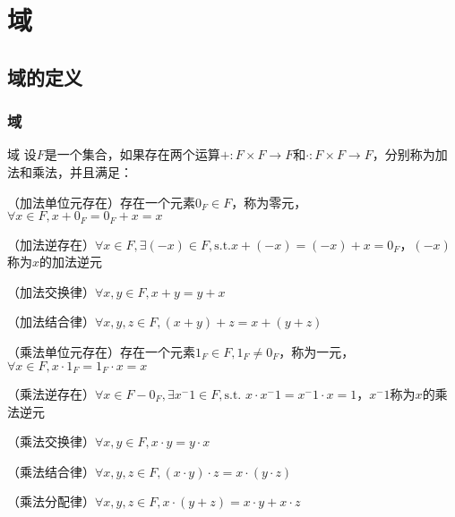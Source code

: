 \documentclass[12pt, a4paper, oneside, UTF8]{ctexbook}
\begin{document}
% 
\else
\fi
\chapter{域}
	\section{域的定义}
		\subsection{域}
			\begin{defn}{域}{}
				设$F$是一个集合，如果存在两个运算$+:F \times F \rightarrow F$和$\cdot :F \times F \rightarrow F$，分别称为加法和乘法，并且满足：
				
				（加法单位元存在）存在一个元素$0_F \in F$，称为零元，$\forall x \in F,x+0_F=0_F+x=x$
				
				（加法逆存在）$ \forall x \in F,\exists (-x) \in F,\text{s.t.}x+(-x)=(-x)+x=0_F$，$(-x)$称为$x$的加法逆元
				
				（加法交换律）$\forall x,y \in F,x+y = y+x$
				
				（加法结合律）$\forall x,y,z \in F,(x+y)+z = x+(y+z)$
				
				（乘法单位元存在）存在一个元素$1_F \in F,1_F \neq 0_F$，称为一元，$\forall x \in F,x\cdot 1_F=1_F \cdot x = x$
				
				（乘法逆存在）$\forall x \in F-{0_F},\exists x^-1 \in F,\text{s.t. }x\cdot x^-1=x^-1 \cdot x = 1$，$x^-1$称为$x$的乘法逆元
				
				（乘法交换律）$\forall x,y \in F,x\cdot y = y\cdot x$
				
				（乘法结合律）$\forall x,y,z \in F,(x\cdot y)\cdot z = x\cdot (y\cdot z)$
				
				（乘法分配律）$\forall x,y,z \in F,x\cdot(y+z)=x\cdot y+x\cdot z$
			\end{defn}
\end{document}
